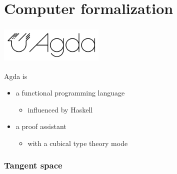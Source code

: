 \documentclass[aspectratio=1610]{beamer}
\begin{document}
\begin{frame}
\begin{columns}
\begin{column}{0.5\textwidth}
    \end{column}
  \end{columns}
\end{frame}

\section{Computer formalization}

\begin{frame}
  \frametitle{\includegraphics[width=5cm]{./images/agda-logo.png}}

  Agda is
  \begin{itemize}
    \item
      a functional programming language
      \begin{itemize}
        \item
          influenced by Haskell
      \end{itemize}
    \item
      a proof assistant
      \begin{itemize}
        \item
          with a \alert{cubical type theory} mode
      \end{itemize}
  \end{itemize}
\end{frame}

\begin{frame}
  \frametitle{Tangent space}
\end{frame}
\end{document}
